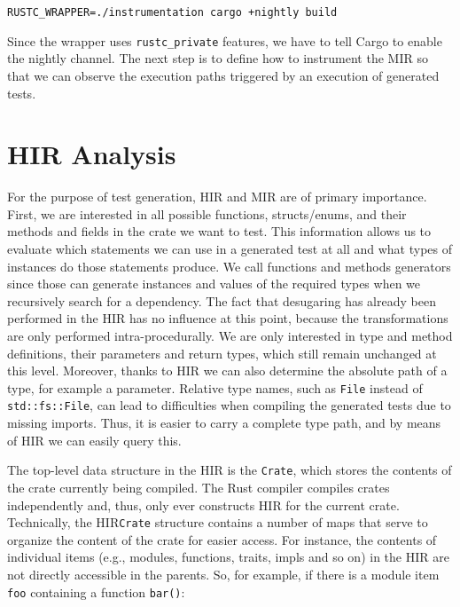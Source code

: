 \documentclass[paper=a4,%
  twoside,%
  BCOR4mm,%
  abstract=true,%
  toc=bibliography,%
  chapterprefix=true,%
  toc=bibliographynumbered,%
  open=right,%
  english,%
  pagesize=pdftex]{scrreprt}
\newcommand{\hir}{\ac{HIR}\xspace}
\newcommand{\mir}{\ac{MIR}\xspace}
\begin{document}
\texttt{RUSTC\string_WRAPPER=./instrumentation cargo \string+nightly build}

Since the wrapper uses \texttt{rustc\string_private} features, we have to tell Cargo to enable the nightly channel. The next step is to define how to instrument the \mir so that we can observe the execution paths triggered by an execution of generated tests.


\section{HIR Analysis}
For the purpose of test generation, \hir and \mir are of primary importance. First, we are interested in all possible functions, structs/enums, and their methods and fields in the crate we want to test. This information allows us to evaluate which statements we can use in a generated test at all and what types of instances do those statements produce. We call functions and methods generators since those can generate instances and values of the required types when we recursively search for a dependency. The fact that desugaring has already been performed in the \hir has no influence at this point, because the transformations are only performed intra-procedurally. We are only interested in type and method definitions, their parameters and return types, which still remain unchanged at this level. Moreover, thanks to \hir we can also determine the absolute path of a type, for example a parameter. Relative type names, such as \texttt{File} instead of \texttt{std::fs::File}, can lead to difficulties when compiling the generated tests due to missing imports. Thus, it is easier to carry a complete type path, and by means of \hir we can easily query this.

The top-level data structure in the \hir is the \texttt{Crate}, which stores the contents of the crate currently being compiled. The Rust compiler compiles crates independently and, thus, only ever constructs \hir for the current crate. Technically, the \hir \texttt{Crate} structure contains a number of maps that serve to organize the content of the crate for easier access. For instance, the contents of individual items (e.g., modules, functions, traits, impls and so on) in the \hir are not directly accessible in the parents. So, for example, if there is a module item \texttt{foo} containing a function \texttt{bar()}:
\end{document}
